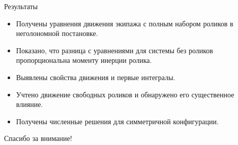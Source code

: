\documentclass{beamer}
\begin{document}
\begin{frame}{Результаты}
  \begin{itemize}
  \item
    Получены уравнения движения экипажа \alert{с полным набором роликов} в неголономной постановке.
  \item
    Показано, что разница с уравнениями для системы без роликов пропорциональна моменту инерции ролика.
  \item
    Выявлены свойства движения и первые интегралы.
  \item \alert{Учтено движение свободных роликов} и обнаружено его существенное влияние.
  \item
    Получены численные решения для симметричной конфигурации.
  \end{itemize}
  \vspace{10pt}
  \centering
  \textcolor{Periwinkle}{Спасибо за внимание!}
\end{frame}
\end{document}
